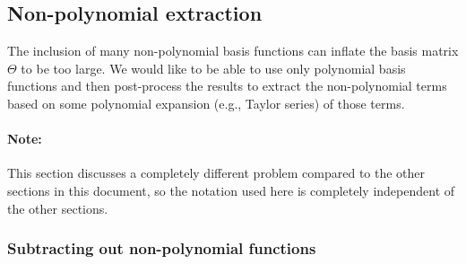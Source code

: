 \documentclass{article}
\begin{document}
\subsection{Non-polynomial extraction}

The inclusion of many non-polynomial basis functions can inflate the basis
matrix $\Theta$ to be too large. We would like to be able to use only polynomial
basis functions and then post-process the results to extract the non-polynomial
terms based on some polynomial expansion (e.g., Taylor series) of those terms.

\paragraph{Note:} This section discusses a completely different problem compared to the other
sections in this document, so the notation used here is completely independent
of the other sections.


\subsubsection{Subtracting out non-polynomial functions}
\end{document}
